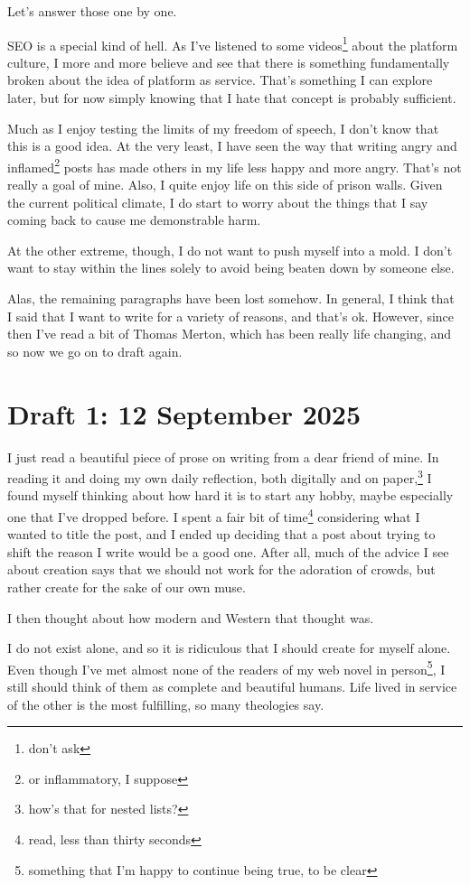 \documentclass[12pt]{article}
\renewcommand{\,}{\textsuperscript{,}}
\begin{document}
Let's answer those one by one.

SEO is a special kind of hell.  
As I've listened to some videos\footnote{don't ask} about the platform culture, I more and more believe and see that there is something fundamentally broken about the idea of platform as service.  
That's something I can explore later, but for now simply knowing that I hate that concept is probably sufficient.

Much as I enjoy testing the limits of my freedom of speech, I don't know that this is a good idea.  
At the very least, I have seen the way that writing angry and inflamed\footnote{or inflammatory, I suppose} posts has made others in my life less happy and more angry.  
That's not really a goal of mine.  
Also, I quite enjoy life on this side of prison walls.  
Given the current political climate, I do start to worry about the things that I say coming back to cause me demonstrable harm.

At the other extreme, though, I do not want to push myself into a mold.  
I don't want to stay within the lines solely to avoid being beaten down by someone else.

Alas, the remaining paragraphs have been lost somehow.
In general, I think that I said that I want to write for a variety of reasons, and that's ok.
However, since then I've read a bit of Thomas Merton, which has been really life changing, and so now we go on to draft again.

\section{Draft 1: 12 September 2025}

I just read a beautiful piece of prose on writing from a dear friend of mine.  
In reading it and doing my own daily reflection, both digitally and on paper,\footnote{how's that for nested lists?} I found myself thinking about how hard it is to start any hobby, maybe especially one that I've dropped before.  
I spent a fair bit of time\footnote{read, less than thirty seconds} considering what I wanted to title the post, and I ended up deciding that a post about trying to shift the reason I write would be a good one.  
After all, much of the advice I see about creation says that we should not work for the adoration of crowds, but rather create for the sake of our own muse.

I then thought about how modern and Western that thought was.

I do not exist alone, and so it is ridiculous that I should create for myself alone.  
Even though I've met almost none of the readers of my web novel in person\footnote{something that I'm happy to continue being true, to be clear}, I still should think of them as complete and beautiful humans.  
Life lived in service of the other is the most fulfilling, so many theologies say.
\end{document}
